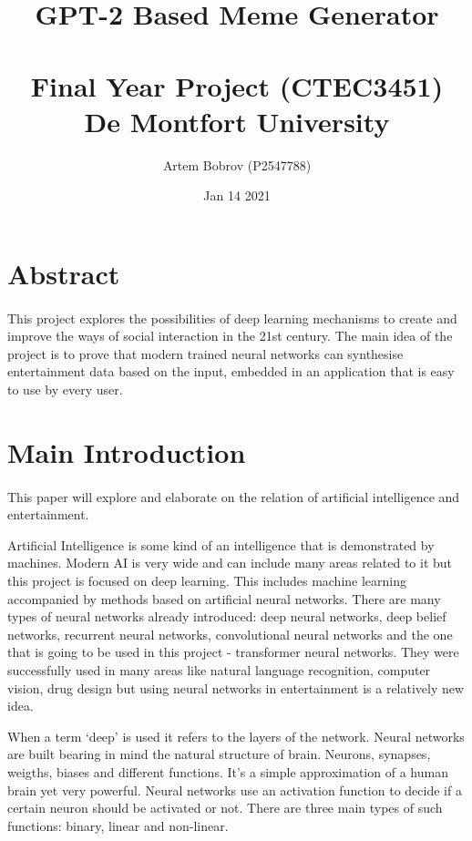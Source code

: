 \documentclass[12pt]{report}
\title{%
      GPT-2 Based Meme Generator\\~\\
      \large Final Year Project (CTEC3451) \\
        De Montfort University}
\author{Artem Bobrov (P2547788)}
\date{Jan 14 2021}
\begin{document}
    \maketitle
    \thispagestyle{empty}
    \clearpage
    \tableofcontents
    \setcounter{tocdepth}{1}
    \thispagestyle{empty}
    \clearpage
    \section*{Abstract}
    
    \paragraph{}
    
    This project explores the possibilities of deep learning mechanisms to create and improve the ways of 
    social interaction in the 21st century. The main idea of the project is to prove that modern trained neural networks can 
    synthesise entertainment data based on the input, embedded in an application that is easy to use by every user.

    \section*{Main Introduction}
    \paragraph{}
    
    This paper will explore and elaborate on the relation of artificial intelligence and entertainment.

    Artificial Intelligence is some kind of an intelligence that is demonstrated by machines. Modern AI is very wide and can include many areas related to it but this project is focused on deep learning. This includes machine learning accompanied by methods based on artificial neural networks.
    There are many types of neural networks already introduced: deep neural networks, deep belief networks, recurrent neural networks, convolutional neural networks and the one that is going to be used in this project - transformer neural networks. They were successfully used in many areas like natural language recognition, computer vision, drug design but
    using neural networks in entertainment is a relatively new idea.

    When a term `deep' is used it refers to the layers of the network. Neural networks are built bearing in mind the natural structure of brain. Neurons, synapses, weigths, biases and different functions. It's a simple approximation of a human brain yet very powerful.
    Neural networks use an activation function to decide if a certain neuron should be activated or not. There are three main types of such functions: binary, linear and non-linear.
\end{document}
